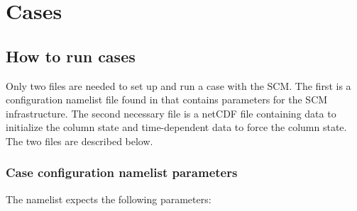 \chapter{Cases}
\label{chapter: cases}

\section{How to run cases}
Only two files are needed to set up and run a case with the SCM. The first is a configuration namelist file found in  that contains parameters for the SCM infrastructure. The second necessary file is a netCDF file containing data to initialize the column state and time-dependent data to force the column state. The two files are described below.

\subsection{Case configuration namelist parameters}
\label{subsection: case config}
The  namelist expects the following parameters:
